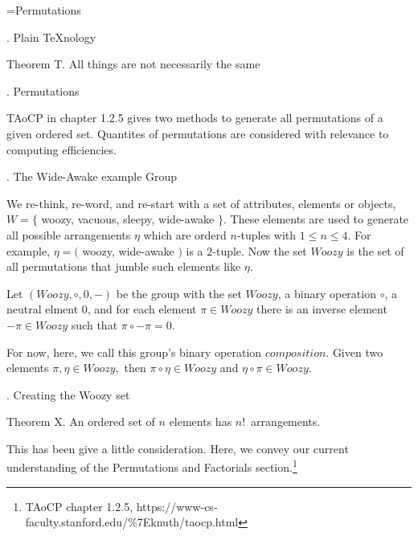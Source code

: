 
\def\a{\left(\matrix}
\def\b{\cr}
\def\c{\right)}

\def\d{\footnote*{http://web.mit.edu/sp.268/www/rubik.pdf}}
\def\f{\footnote*{TAoCP chapter 1.2.5,
  https://www-cs-faculty.stanford.edu/\%7Eknuth/taocp.html}}
\def\e{\bigskip}
\def\R{Woozy}
\def\*{\circ}

\vsize=300pt %
\hsize=480pt %
\footline={\tenrm Permutations\quad\dotfill\quad \folio}
\raggedright

. Plain \TeX nology %

\proclaim Theorem T. All things are not necessarily the same

. Permutations

\e
TAoCP in chapter 1.2.5 gives two methods to generate
all permutations of a given ordered set.
Quantites of permutations are considered
with relevance to computing efficiencies.

. The Wide-Awake example Group

\e
We re-think, re-word, and re-start
with a set of attributes, elements or objects,\break
$W=\{$ woozy, vacuous, sleepy, wide-awake $\}.$
These elements are used to generate all possible
arrangements $\eta$ which are orderd $n$-tuples with
$1\le n\le4.$
For example, $\eta=($ woozy, wide-awake $)$ is a $2$-tuple.
Now the set $\R$ is the set of all permutations that jumble
such elements like $\eta.$

\e
Let $(\R,\*,0,-)$ be the group with the set $\R$, a binary
operation $\*$, a neutral elment $0$, and
for each element $\pi\in\R$ there is an inverse element
$-\pi\in\R$ such that $\pi\*-\pi=0.$

\e
For now, here, we call this group's binary operation $composition$.
Given two elements
$\pi,\eta\in\R,$ then
$\pi\*\eta\in\R$ and $\eta\*\pi\in\R.$


\eject

. Creating the Woozy set

\proclaim Theorem X. An ordered set of $n$ elements
has $n!$~arrangements.

This has been give a little consideration.  Here, we
convey our current understanding of the Permutations and
Factorials section.\f

